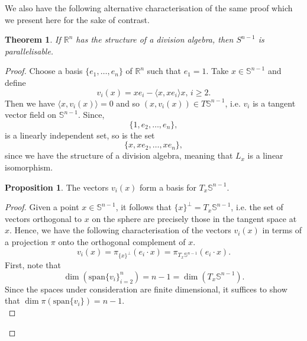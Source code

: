 \documentclass[12pt,a4paper]{article}
\numberwithin{equation}{section}
\newtheorem{theorem}{Theorem}[section]
\theoremstyle{definition}
\newtheorem{proposition}{Proposition}[section]
\theoremstyle{remark}
\begin{document}
We also have the following alternative characterisation of the same proof which we present here for the sake of contrast.
\begin{theorem}
If $\mathbb{R}^n$ has the structure of a division algebra, then $S^{n-1}$ is parallelisable.
\end{theorem}
\begin{proof}
Choose a basis $\{e_1,\ldots,e_n\}$ of $\mathbb{R}^n$ such that $e_1=1$. Take $x\in\mathbb{S}^{n-1}$ and define
\begin{equation}
v_i(x)=xe_i-\langle x,xe_i\rangle x,\,i\geq 2.
\label{eq:vi-orig}
\end{equation}
Then we have $\langle x,v_i(x)\rangle =0$ and so $(x,v_i(x))\in T\mathbb{S}^{n-1}$, i.e. $v_i$ is a tangent vector field on $\mathbb{S}^{n-1}$. Since,
\[
\{1,e_2,\ldots,e_n\},
\]
is a linearly independent set, so is the set
\[
\{x,xe_2,\ldots,xe_n\},
\]
since we have the structure of a division algebra, meaning that $L_x$ is a linear isomorphism.

\begin{proposition}
The vectors $v_i(x)$ form a basis for $T_x\mathbb{S}^{n-1}$.
\end{proposition}
\begin{proof}
Given a point $x\in\mathbb{S}^{n-1}$, it follows that $\{x\}^\bot=T_x\mathbb{S}^{n-1}$, i.e. the set of vectors orthogonal to $x$ on the sphere are precisely those in the tangent space at $x$.
Hence, we have the following characterisation of the vectors $v_i(x)$ in terms of a projection $\pi$ onto the orthogonal complement of $x$.
\[
v_i(x)=\pi_{\{x\}^\bot}(e_i\cdot x)=\pi_{T_x\mathbb{S}^{n-1}}(e_i\cdot x).
\]
First, note that 
\[
\dim\left(\mathrm{span}\{v_i\}_{i=2}^n\right)=n-1=\dim\left(T_x\mathbb{S}^{n-1}\right).
\]
Since the spaces under consideration are finite dimensional, it suffices to show that $\dim \pi(\mathrm{span}\{v_i\}) =n-1$.\\


\end{proof}
\end{proof}
\end{document}
